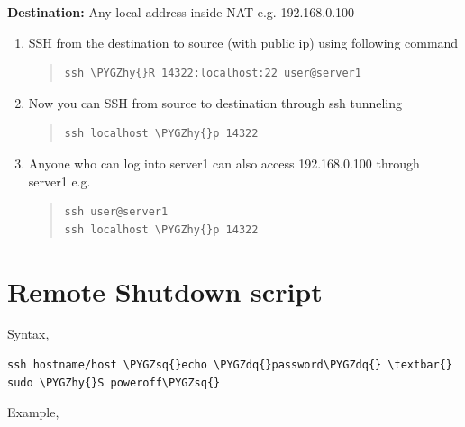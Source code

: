 \documentclass[letterpaper,10pt,english]{sphinxmanual}
\def\PYGZhy{\char`\-}
\def\PYGZsq{\char`\'}
\def\PYGZdq{\char`\"}
\begin{document}
\textbf{Destination:} Any local address inside NAT e.g. 192.168.0.100
\begin{enumerate}
\item {} 
SSH from the destination to source (with public ip) using following command
\begin{quote}

\begin{Verbatim}[commandchars=\\\{\}]
ssh \PYGZhy{}R 14322:localhost:22 user@server1
\end{Verbatim}
\end{quote}

\item {} 
Now you can SSH from source to destination through ssh tunneling
\begin{quote}

\begin{Verbatim}[commandchars=\\\{\}]
ssh localhost \PYGZhy{}p 14322
\end{Verbatim}
\end{quote}

\item {} 
Anyone who can log into server1 can also access 192.168.0.100 through server1 e.g.
\begin{quote}

\begin{Verbatim}[commandchars=\\\{\}]
ssh user@server1
ssh localhost \PYGZhy{}p 14322
\end{Verbatim}
\end{quote}

\end{enumerate}


\section{Remote Shutdown script}
\label{_source/things/ssh_shutdown:remote-shutdown-script}\label{_source/things/ssh_shutdown::doc}
Syntax,

\begin{Verbatim}[commandchars=\\\{\}]
ssh hostname/host \PYGZsq{}echo \PYGZdq{}password\PYGZdq{} \textbar{} sudo \PYGZhy{}S poweroff\PYGZsq{}
\end{Verbatim}

Example,
\end{document}
